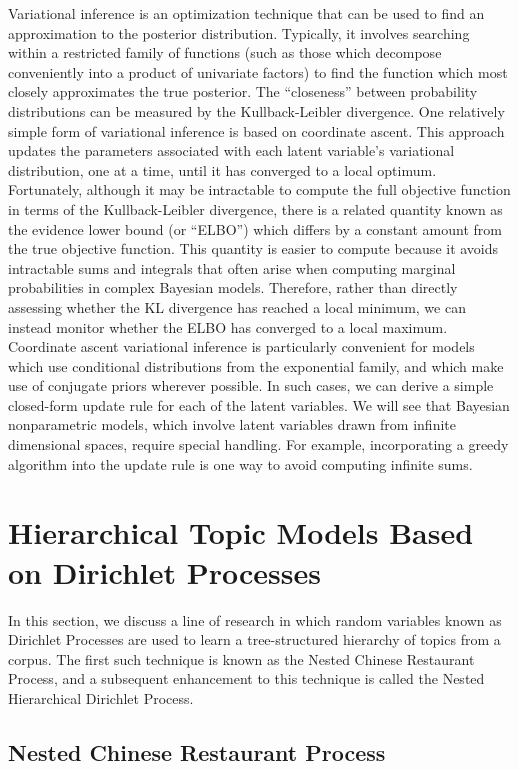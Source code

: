 \documentclass{article}
\begin{document}
Variational inference is an optimization technique that can be used to find an approximation to the posterior distribution.
Typically, it involves searching within a restricted family of functions (such as those which decompose conveniently into a product of univariate factors) to find the function which most closely approximates the true posterior.
The ``closeness'' between probability distributions can be measured by the Kullback-Leibler divergence.
One relatively simple form of variational inference is based on coordinate ascent.
This approach updates the parameters associated with each latent variable's variational distribution, one at a time, until it has converged to a local optimum.
Fortunately, although it may be intractable to compute the full objective function in terms of the Kullback-Leibler divergence, there is a related quantity known as the evidence lower bound (or ``ELBO'') which differs by a constant amount from the true objective function.
This quantity is easier to compute because it avoids intractable sums and integrals that often arise when computing marginal probabilities in complex Bayesian models.
Therefore, rather than directly assessing whether the KL divergence has reached a local minimum, we can instead monitor whether the ELBO has converged to a local maximum.
Coordinate ascent variational inference is particularly convenient for models which use conditional distributions from the exponential family, and which make use of conjugate priors wherever possible.
In such cases, we can derive a simple closed-form update rule for each of the latent variables.
We will see that Bayesian nonparametric models, which involve latent variables drawn from infinite dimensional spaces, require special handling.
For example, incorporating a greedy algorithm into the update rule is one way to avoid computing infinite sums.

\section{Hierarchical Topic Models Based on Dirichlet Processes}

In this section, we discuss a line of research in which random variables known as Dirichlet Processes are used to learn a tree-structured hierarchy of topics from a corpus.
The first such technique is known as the Nested Chinese Restaurant Process, and a subsequent enhancement to this technique is called the Nested Hierarchical Dirichlet Process.

\subsection{Nested Chinese Restaurant Process}
\end{document}
